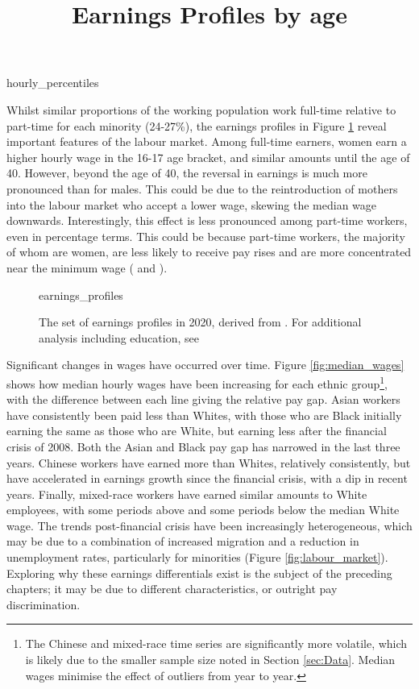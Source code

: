 \documentclass[class=article, crop=false]{standalone}
\begin{document}
{hourly_percentiles}

Whilst similar proportions of the working population work full-time relative to part-time for each minority (24-27\%), the earnings profiles in Figure \ref{fig:earnings_profiles} reveal important features of the labour market. Among full-time earners, women earn a higher hourly wage in the 16-17 age bracket, and similar amounts until the age of 40. However, beyond the age of 40, the reversal in earnings is much more pronounced than for males. This could be due to the reintroduction of mothers into the labour market who accept a lower wage, skewing the median wage downwards. Interestingly, this effect is less pronounced among part-time workers, even in percentage terms. This could be because part-time workers, the majority of whom are women, are less likely to receive pay rises and are more concentrated near the minimum wage (\citet{IFS} and \citet{ONSi}).

\begin{figure}[h]
\centering
    \title{Earnings Profiles by age}
    {earnings_profiles}
    \caption{The set of earnings profiles in 2020, derived from \citet{ONSc}. For additional analysis including education, see \citet{Mincer}}
    \label{fig:earnings_profiles}
    \vspace{-10pt}
\end{figure}

Significant changes in wages have occurred over time. Figure \ref{fig:median_wages} shows how median hourly wages have been increasing for each ethnic group\footnote{The Chinese and mixed-race time series are significantly more volatile, which is likely due to the smaller sample size noted in Section \ref{sec:Data}. Median wages minimise the effect of outliers from year to year.}, with the difference between each line giving the relative pay gap. Asian workers have consistently been paid less than Whites, with those who are Black initially earning the same as those who are White, but earning less after the financial crisis of 2008. Both the Asian and Black pay gap has narrowed in the last three years. Chinese workers have earned more than Whites, relatively consistently, but have accelerated in earnings growth since the financial crisis, with a dip in recent years. Finally, mixed-race workers have earned similar amounts to White employees, with some periods above and some periods below the median White wage. The trends post-financial crisis have been increasingly heterogeneous, which may be due to a combination of increased migration \citep{ONSj} and a reduction in unemployment rates, particularly for minorities (Figure \ref{fig:labour_market}). Exploring why these earnings differentials exist is the subject of the preceding chapters; it may be due to different characteristics, or outright pay discrimination.
\end{document}

